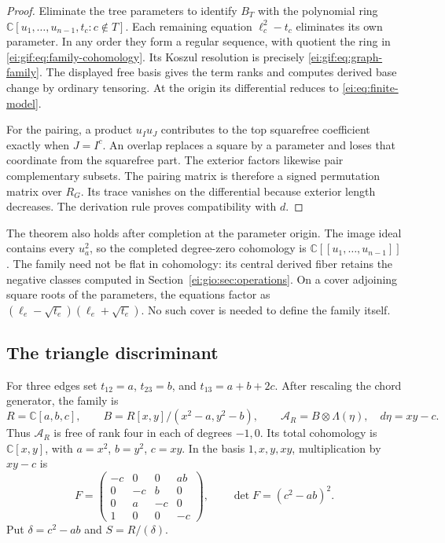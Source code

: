 \begin{proof}
Eliminate the tree parameters to identify
$B_T$ with the polynomial ring
$\mathbb C[u_1,\ldots,u_{n-1},t_c:c\notin T]$.
Each remaining equation $\ell_c^2-t_c$ eliminates
its own parameter. In any order they form a regular
sequence, with quotient the ring in
\eqref{ei:gif:eq:family-cohomology}. Its Koszul resolution
is precisely \eqref{ei:gif:eq:graph-family}.
The displayed free basis gives the term ranks and
computes derived base change by ordinary tensoring.
At the origin its differential reduces to
\eqref{ei:eq:finite-model}.

For the pairing, a product $u_Iu_J$ contributes to
the top squarefree coefficient exactly when
$J=I^c$. An overlap replaces a square by a parameter
and loses that coordinate from the squarefree part.
The exterior factors likewise pair complementary
subsets. The pairing matrix is therefore a signed
permutation matrix over $R_G$. Its trace vanishes on
the differential because exterior length decreases.
The derivation rule proves compatibility with $d$.
\end{proof}

The theorem also holds after completion at the parameter
origin. The image ideal contains every $u_a^2$, so
the completed degree-zero cohomology is
$\mathbb C[[u_1,\ldots,u_{n-1}]]$.
The family need not be flat in cohomology: its central
derived fiber retains the negative classes computed
in Section~\ref{ei:gio:sec:operations}.
On a cover adjoining square roots of the parameters,
the equations factor as
$(\ell_e-\sqrt{t_e})(\ell_e+\sqrt{t_e})$.
No such cover is needed to define the family itself.

\subsection{The triangle discriminant}

For three edges set
$t_{12}=a$, $t_{23}=b$, and $t_{13}=a+b+2c$.
After rescaling the chord generator, the family is
\begin{equation}\label{ei:gif:eq:triangle-family}
 R=\mathbb C[a,b,c],\qquad
 B=R[x,y]/(x^2-a,y^2-b),\qquad
 \mathcal A_R=B\otimes\Lambda(\eta),\quad d\eta=xy-c.
\end{equation}
Thus $\mathcal A_R$ is free of rank four in each of
degrees $-1,0$. Its total cohomology is
$\mathbb C[x,y]$, with $a=x^2$, $b=y^2$, $c=xy$.
In the basis $1,x,y,xy$, multiplication by $xy-c$ is
\begin{equation}\label{ei:gif:eq:triangle-matrix}
 F=\begin{pmatrix}
 -c&0&0&ab\\
 0&-c&b&0\\
 0&a&-c&0\\
 1&0&0&-c
 \end{pmatrix},\qquad
 \det F=(c^2-ab)^2.
\end{equation}
Put $\delta=c^2-ab$ and $S=R/(\delta)$.

